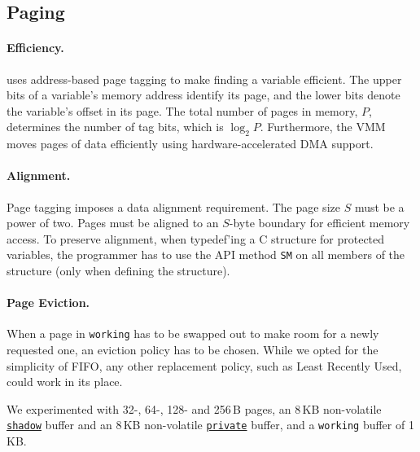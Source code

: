 \subsection{Paging}
\label{sec:impl:paging}


\paragraph{Efficiency.}
\sys uses address-based page tagging to make finding a variable efficient.  The
upper bits of a variable's memory address identify its page, and the lower bits
denote the variable's offset in its page. The total number of pages in memory,
$P$, determines the number of tag bits, which is $\log_2 P$.
%
Furthermore, the VMM moves pages of data efficiently using hardware-accelerated DMA support.

\paragraph{Alignment.}
Page tagging imposes a data alignment requirement.
The page size $S$ must be a power of two. 
%
Pages must be aligned to an $S$-byte boundary for efficient memory access. 
%
To preserve alignment, when typedef'ing a C structure for protected variables, the programmer has to use the API method \texttt{SM} on all members of the structure (only when defining the structure).
%

\paragraph{Page Eviction.}
When a page in \texttt{working} has to be swapped out to make room for a newly requested one, an eviction policy has to be chosen.
While we opted for the simplicity of FIFO, any other replacement policy, such as Least Recently Used, could work in its place.

We experimented with 32-, 64-, 128- and 256\,B pages, an 8\,KB non-volatile \texttt{\underline{shadow}} buffer and an 8\,KB non-volatile \texttt{\underline{private}} buffer, and a \texttt{working} buffer
of 1\,KB.


